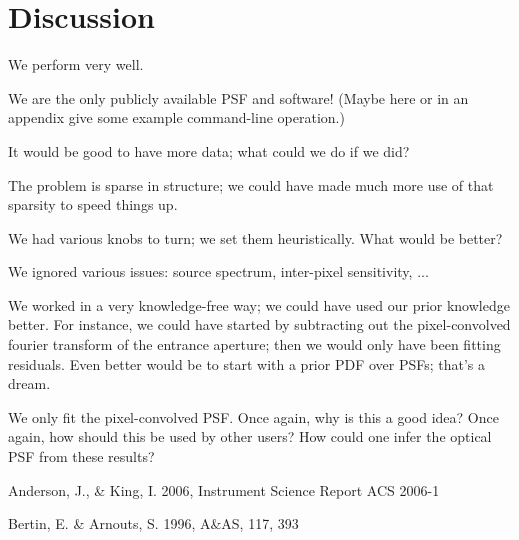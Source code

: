 \documentclass[12pt,letterpaper,preprint]{aastex}
\begin{document}
\section{Discussion}

We perform very well.

We are the only publicly available PSF and software!
(Maybe here or in an appendix give some example command-line operation.)

It would be good to have more data;
  what could we do if we did?

The problem is sparse in structure;
  we could have made much more use of that sparsity to speed things up.

We had various knobs to turn; we set them heuristically.
What would be better?

We ignored various issues: source spectrum, inter-pixel sensitivity, ...

We worked in a very knowledge-free way;
  we could have used our prior knowledge better.
For instance, we could have started by subtracting out the pixel-convolved fourier transform of the entrance aperture;
  then we would only have been fitting residuals.
Even better would be to start with a prior PDF over PSFs;
  that's a dream.

We only fit the pixel-convolved PSF.
Once again, why is this a good idea?
Once again, how should this be used by other users?
How could one infer the optical PSF from these results?

\clearpage


\begin{thebibliography}{44}

{Anderson}, J., \& {King}, I. 2006, Instrument Science Report ACS 2006-1

{Bertin}, E. \& {Arnouts}, S. 1996, A\&AS, 117, 393

\end{thebibliography}
\end{document}
